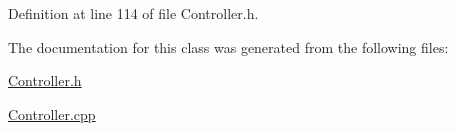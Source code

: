 Definition at line 114 of file Controller.\+h.



The documentation for this class was generated from the following files\+:\begin{DoxyCompactItemize}
\item 
\hyperlink{Controller_8h}{Controller.\+h}\item 
\hyperlink{Controller_8cpp}{Controller.\+cpp}\end{DoxyCompactItemize}
